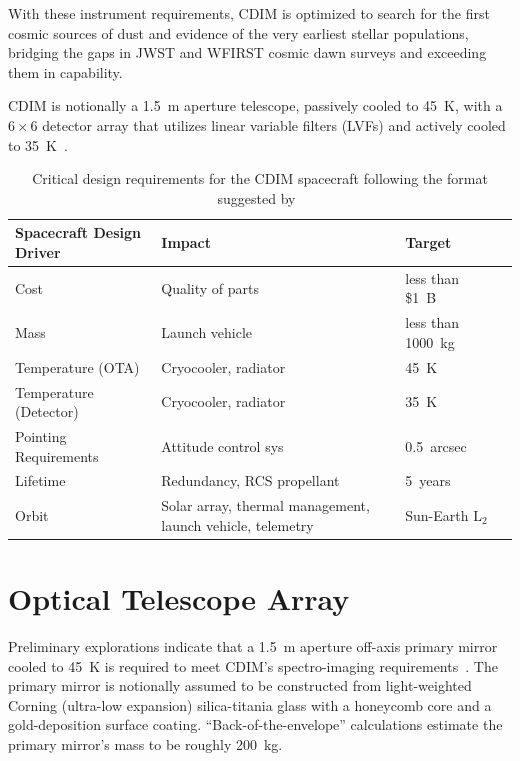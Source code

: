 \documentclass{ws-jai}
\begin{document}
With these instrument requirements, CDIM is optimized to search for the first cosmic sources of dust and evidence of the very earliest stellar populations, bridging the gaps in JWST and WFIRST cosmic dawn surveys and exceeding them in capability.

CDIM is notionally a \SI{1.5}{\meter} aperture telescope, passively cooled to \SI{45}{\kelvin}, with a $6\times6$ detector array that utilizes linear variable filters (LVFs) and actively cooled to \SI{35}{\kelvin}~\cite{cooray2016cdim2page}.

\begin{table}
  \caption{Critical design requirements for the CDIM spacecraft following the format suggested by~\citeauthor{smad2015}}
  \small\centering
  \begin{tabular}{@{}llll@{}} \toprule
    Spacecraft Design Driver & Impact & Target \\ \midrule
    Cost & Quality of parts & less than \$\SI{1}{B} \\
    Mass & Launch vehicle & less than \SI{1000}{\kilo\gram} \\
    Temperature (OTA) & Cryocooler, radiator & \SI{45}{\kelvin} \\
    Temperature (Detector) & Cryocooler, radiator & \SI{35}{\kelvin} \\
    Pointing Requirements & Attitude control sys & \SI{0.5}{arcsec} \\
    Lifetime & Redundancy, RCS propellant & \SI{5}{years} \\
    Orbit & Solar array, thermal management, launch vehicle, telemetry & Sun-Earth L$_2$ \\
    \bottomrule
  \end{tabular}
\label{tab:critical-params}
\end{table}
\section{Optical Telescope Array}
\label{sec:ota}
Preliminary explorations indicate that a \SI{1.5}{\meter} aperture off-axis primary mirror cooled to \SI{45}{\kelvin} is required to meet CDIM's spectro-imaging  requirements~\cite{cooray2016cdim2page}.
The primary mirror is notionally assumed to be constructed from light-weighted Corning (ultra-low expansion) silica-titania glass with a honeycomb core and a gold-deposition surface coating.
``Back-of-the-envelope'' calculations estimate the primary mirror's mass to be roughly \SI{200}{\kilo\gram}.
\end{document}
